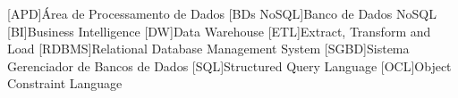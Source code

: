 \begin{acronym}[ACRONYM] 

[APD]{Área de Processamento de Dados}
[BDs NoSQL]{Banco de Dados NoSQL}
[BI]{Business Intelligence}
[DW]{Data Warehouse}
[ETL]{Extract, Transform and Load}
[RDBMS]{Relational Database Management System}
[SGBD]{Sistema Gerenciador de Bancos de Dados}
[SQL]{Structured Query Language}
[OCL]{Object Constraint Language}



\end{acronym}